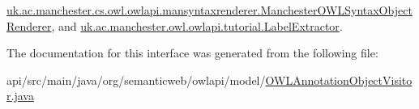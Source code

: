 \hyperlink{classuk_1_1ac_1_1manchester_1_1cs_1_1owl_1_1owlapi_1_1mansyntaxrenderer_1_1_manchester_o_w_l_syntax_object_renderer_a0dc8f5277963ab038244c37425c4dba2}{uk.\-ac.\-manchester.\-cs.\-owl.\-owlapi.\-mansyntaxrenderer.\-Manchester\-O\-W\-L\-Syntax\-Object\-Renderer}, and \hyperlink{classuk_1_1ac_1_1manchester_1_1owl_1_1owlapi_1_1tutorial_1_1_label_extractor_adea6d52858f8a80731ff595bc85e39c1}{uk.\-ac.\-manchester.\-owl.\-owlapi.\-tutorial.\-Label\-Extractor}.



The documentation for this interface was generated from the following file\-:\begin{DoxyCompactItemize}
\item 
api/src/main/java/org/semanticweb/owlapi/model/\hyperlink{_o_w_l_annotation_object_visitor_8java}{O\-W\-L\-Annotation\-Object\-Visitor.\-java}\end{DoxyCompactItemize}
